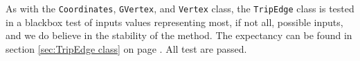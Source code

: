 As with the \texttt{Coordinates}, \texttt{GVertex}, and \texttt{Vertex} class, the \texttt{TripEdge} class is tested in a blackbox test of inputs values representing most, if not all, possible inputs, and we do believe in the stability of the method. The expectancy can be found in section \ref{sec:TripEdge class} on page \pageref{sec:TripEdge class}. All test are passed.